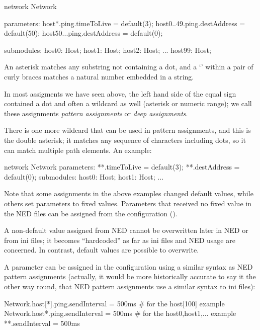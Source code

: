\begin{ned}
network Network
{
    parameters:
        host*.ping.timeToLive = default(3);
        host{0..49}.ping.destAddress = default(50);
        host{50..}.ping.destAddress = default(0);

    submodules:
        host0: Host;
        host1: Host;
        host2: Host;
        ...
        host99: Host;
}
\end{ned}

An asterisk matches any substring not containing a dot, and a `'
within a pair of curly braces matches a natural number embedded in a
string.

In most assigments we have seen above, the left hand side of the equal sign
contained a dot and often a wildcard as well (asterisk or numeric range);
we call these assignments \textit{pattern assignments} or \textit{deep
assignments}.

There is one more wildcard that can be used in pattern assignments, and
this is the double asterisk; it matches any sequence of characters
including dots, so it can match multiple path elements. An example:

\begin{ned}
network Network
{
    parameters:
        **.timeToLive = default(3);
        **.destAddress = default(0);
    submodules:
        host0: Host;
        host1: Host;
        ...
}
\end{ned}

Note that some assignments in the above examples changed default values,
while others set parameters to fixed values. Parameters that received no
fixed value in the NED files can be assigned from the configuration
().

\begin{important}
    A non-default value assigned from NED cannot be overwritten later in
    NED or from ini files; it becomes ``hardcoded'' as far as ini files
    and NED usage are concerned. In contrast, default values are possible
    to overwrite.
\end{important}

A parameter can be assigned in the configuration using a similar syntax as
NED pattern assignments (actually, it would be more historically accurate
to say it the other way round, that NED pattern assignments use a similar
syntax to ini files):


\begin{inifile}
Network.host[*].ping.sendInterval = 500ms  # for the host[100] example
Network.host*.ping.sendInterval = 500ms    # for the host0,host1,... example
**.sendInterval = 500ms
\end{inifile}

